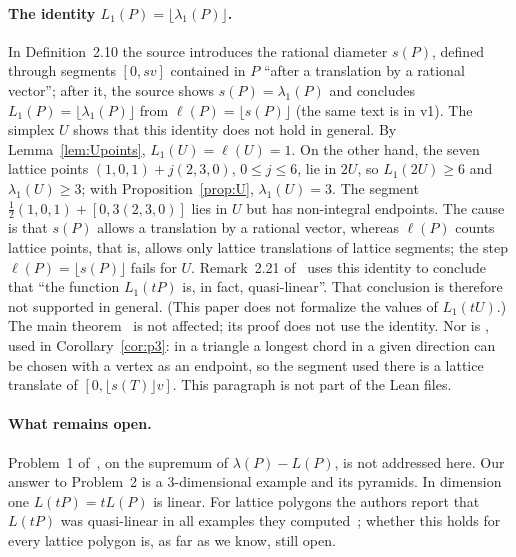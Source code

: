 \documentclass[11pt]{article}
\theoremstyle{definition}
\theoremstyle{remark}
\begin{document}
\paragraph{The identity \texorpdfstring{$L_1(P)=\lfloor\lambda_1(P)\rfloor$}{L1(P)=floor(lambda1(P))}.}
In Definition~2.10 the source introduces the rational diameter $s(P)$,
defined through segments $[0,sv]$ contained in $P$ ``after a translation by a
rational vector''; after it, the source shows $s(P)=\lambda_1(P)$ and
concludes
$L_1(P)=\lfloor\lambda_1(P)\rfloor$ from $\ell(P)=\lfloor s(P)\rfloor$
\cite[p.~6]{ss} (the same text is in v1). The simplex $U$ shows that this
identity does not hold in general. By Lemma~\ref{lem:Upoints},
$L_1(U)=\ell(U)=1$. On the other hand, the seven lattice points
$(1,0,1)+j(2,3,0)$, $0\le j\le6$, lie in $2U$, so $L_1(2U)\ge6$ and
$\lambda_1(U)\ge3$; with Proposition~\ref{prop:U}, $\lambda_1(U)=3$. The
segment $\frac12(1,0,1)+[0,3(2,3,0)]$ lies in $U$ but has non-integral
endpoints. The cause is that $s(P)$ allows a translation by a rational vector,
whereas $\ell(P)$ counts lattice points, that is, allows only lattice
translations of lattice segments; the step $\ell(P)=\lfloor s(P)\rfloor$
fails for $U$. Remark~2.21 of~\cite{ss} uses this identity to conclude that
``the function $L_1(tP)$ is, in fact, quasi-linear''. That conclusion is
therefore not supported in general. (This paper does not formalize the
values of $L_1(tU)$.) The main
theorem~\cite[Theorem~2.20]{ss} is not affected; its proof does not use the
identity. Nor is \cite[Corollary~3.2]{ss}, used in Corollary~\ref{cor:p3}: in
a triangle a longest chord in a given direction can be chosen with a vertex as
an endpoint, so the segment used there is a lattice translate of
$[0,\lfloor s(T)\rfloor v]$. This paragraph is not part of the Lean files.

\paragraph{What remains open.}
Problem~1 of~\cite{ss}, on the supremum of $\lambda(P)-L(P)$, is not
addressed here. Our answer to Problem~2 is a $3$-dimensional example and its
pyramids. In dimension one $L(tP)=tL(P)$ is linear. For lattice polygons the
authors report that $L(tP)$ was quasi-linear in all examples they
computed~\cite[p.~12]{ss}; whether this holds for every lattice polygon is,
as far as we know, still open.
\end{document}
